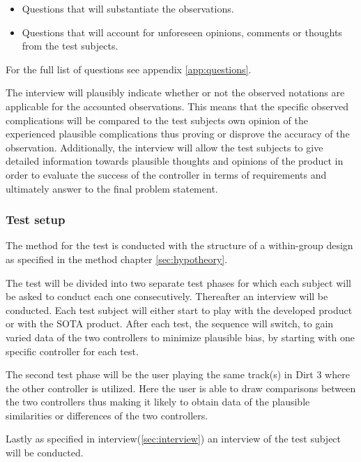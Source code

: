 \begin{itemize}
	\item Questions that will substantiate the observations.
	\item Questions that will account for unforeseen opinions, comments or thoughts from the test subjects.
\end{itemize}

 For the full list of questions see appendix \ref{app:questions}.
 
 
The interview will plausibly indicate whether or not the observed notations are applicable for the accounted observations.
This means that the specific observed complications will be compared to the test subjects own opinion of the experienced plausible complications thus proving or disprove the accuracy of the observation. 
Additionally, the interview will allow the test subjects to give detailed information towards plausible thoughts and opinions of the product in order to evaluate the success of the controller in terms of requirements and ultimately answer to the final problem statement.


\subsubsection{Test setup}
The method for the test is conducted with the structure of a within-group design as specified in the method chapter \ref{sec:hypotheory}.
\bigskip

The test will be divided into two separate test phases for which each subject will be asked to conduct each one consecutively. 
Thereafter an interview will be conducted. 
Each test subject will either start to play with the developed product or with the SOTA product. 
After each test, the sequence will switch, to gain varied data of the two controllers to minimize plausible bias, by starting with one specific controller for each test.
\bigskip

The second test phase will be the user playing the same track(s) in Dirt 3 where the other controller is utilized. 
Here the user is able to draw comparisons between the two controllers thus making it likely to obtain data of the plausible similarities or differences of the two controllers.
\bigskip

Lastly as specified in interview(\ref{sec:interview}) an interview of the test subject will be conducted. 
